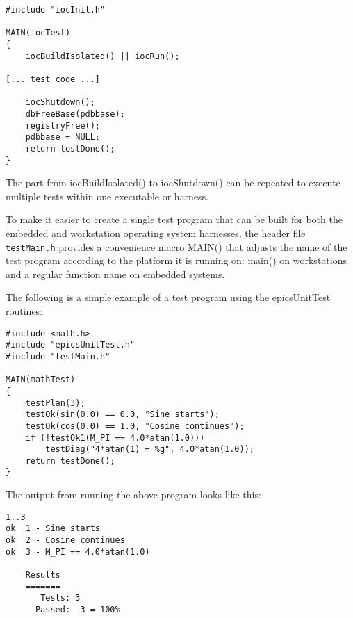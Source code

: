 \begin{verbatim}
#include "iocInit.h"

MAIN(iocTest)
{
    iocBuildIsolated() || iocRun();

[... test code ...]

    iocShutdown();
    dbFreeBase(pdbbase);
    registryFree();
    pdbbase = NULL;
    return testDone();
}
\end{verbatim}

The part from iocBuildIsolated() to iocShutdown() can be repeated to execute multiple tests within one executable or harness.

To make it easier to create a single test program that can be built for both the embedded and workstation operating system harnesses, the header file \verb|testMain.h| provides a convenience macro MAIN() that adjusts the name of the test program according to the platform it is running on: main() on workstations and a regular function name on embedded systems.

The following is a simple example of a test program using the epicsUnitTest routines:

\begin{verbatim}
#include <math.h>
#include "epicsUnitTest.h"
#include "testMain.h"

MAIN(mathTest)
{
    testPlan(3);
    testOk(sin(0.0) == 0.0, "Sine starts");
    testOk(cos(0.0) == 1.0, "Cosine continues");
    if (!testOk1(M_PI == 4.0*atan(1.0)))
        testDiag("4*atan(1) = %g", 4.0*atan(1.0));
    return testDone();
}
\end{verbatim}

The output from running the above program looks like this:

\begin{verbatim}
1..3
ok  1 - Sine starts
ok  2 - Cosine continues
ok  3 - M_PI == 4.0*atan(1.0)

    Results
    =======
       Tests: 3
      Passed:  3 = 100%

\end{verbatim}
